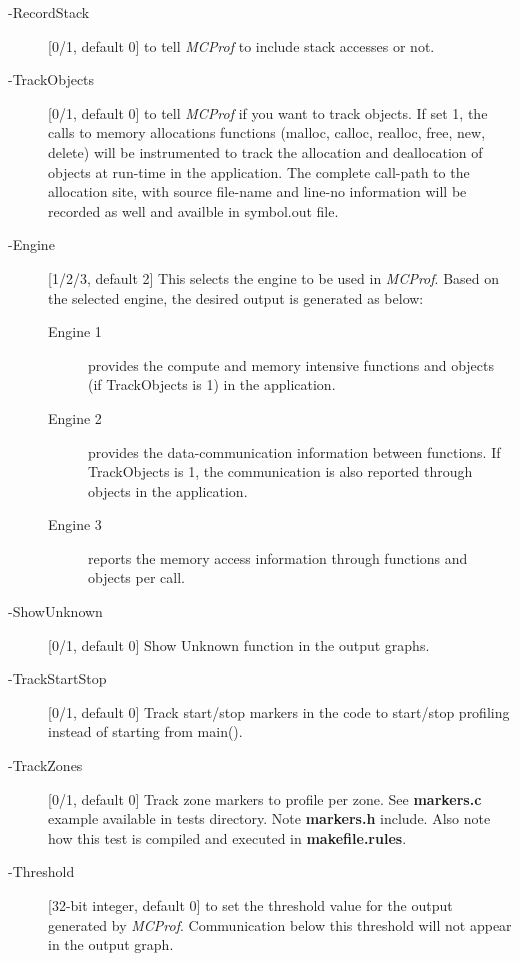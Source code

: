 \documentclass[10pt]{article}
\newcommand{\MCPROF}{\emph{MCProf}}
\begin{document}
\begin{description}

\item [-RecordStack] [0/1, default 0] to tell \MCPROF{} to include stack accesses or not.

\item [-TrackObjects] [0/1, default 0] to tell \MCPROF{} if you want to track 
objects. If set 1, the calls to memory allocations functions (malloc, calloc, 
realloc, free, new, delete) will be instrumented to track the allocation and 
deallocation of objects at run-time in the application. The complete call-path 
to the allocation site, with source file-name and line-no information will be 
recorded as well and availble in symbol.out file.

\item [-Engine] [1/2/3, default 2] This selects the engine to be used in
    \MCPROF{}.  Based on the selected engine, the desired output is generated as
    below:

    \begin{description}

    \item [Engine 1]    provides the compute and memory intensive functions and
        objects (if TrackObjects is 1) in the application.

    \item [Engine 2]    provides the data-communication information between
        functions. If TrackObjects is 1, the communication is also reported
        through objects in the application.

    \item [Engine 3]    reports the memory access information through functions
        and objects per call.

    \end{description}

\item [-ShowUnknown]  [0/1, default 0] Show Unknown function in the output graphs.

\item [-TrackStartStop] [0/1, default 0] Track start/stop markers in the code to
    start/stop profiling instead of starting from main().

\item [-TrackZones] [0/1, default 0] Track zone markers to profile per zone. See
    \textbf{markers.c} example available in tests directory. Note \textbf{markers.h}
    include. Also note how this test is compiled and executed in \textbf{makefile.rules}.

\item [-Threshold] [32-bit integer, default 0] to set the threshold value for the 
    output generated by \MCPROF{}. Communication below this threshold will not appear
    in the output graph.

\end{description}
\end{document}
